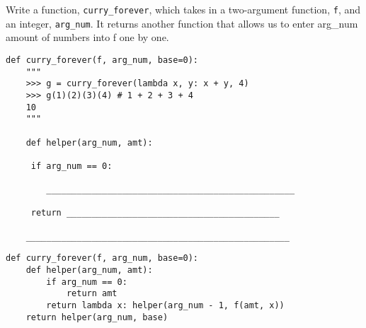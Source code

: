 \begin{blocksection}
\question Write a function, \texttt{curry\_forever}, which takes in a two-argument function, \texttt{f}, and an integer, \texttt{arg\_num}. It returns another function that allows us to enter arg\_num amount of numbers into f one by one.

\begin{lstlisting}
def curry_forever(f, arg_num, base=0):
    """
    >>> g = curry_forever(lambda x, y: x + y, 4)
    >>> g(1)(2)(3)(4) # 1 + 2 + 3 + 4
    10 
    """

    def helper(arg_num, amt):
    
   	 if arg_num == 0:
   	 
   	    _________________________________________________
   	    
   	 return __________________________________________
   	 
    ____________________________________________________

\end{lstlisting}

\begin{solution}
\begin{lstlisting}
def curry_forever(f, arg_num, base=0):
    def helper(arg_num, amt):
   	    if arg_num == 0:
   		    return amt
   	    return lambda x: helper(arg_num - 1, f(amt, x))
    return helper(arg_num, base)

\end{lstlisting}
\end{solution}
\end{blocksection}

